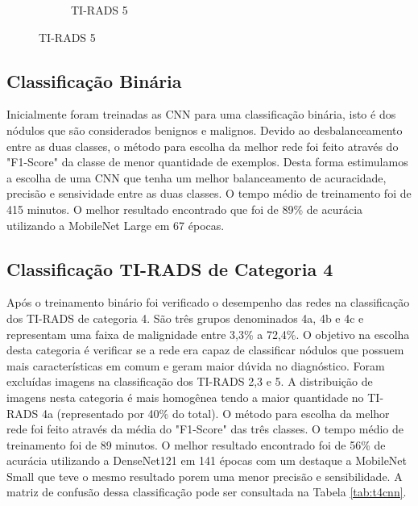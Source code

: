 \documentclass[12pt]{article}
\begin{document}
\begin{figure}[h]
\begin{subfigure}[t]{.3\textwidth}
  \caption{TI-RADS 5}
  \label{fig:t5s}
\end{subfigure}
\label{fig:tsquare}
\end{figure}

\subsection{Classificação Binária}

Inicialmente foram treinadas as CNN para uma classificação binária, isto é dos nódulos que são considerados benignos e malignos. Devido ao desbalanceamento entre as duas classes, o método para escolha da melhor rede foi feito através do "F1-Score" da classe de menor quantidade de exemplos. Desta forma estimulamos a escolha de uma CNN que tenha um melhor balanceamento de acuracidade, precisão e sensividade entre as duas classes. O tempo médio de treinamento foi de 415 minutos. O melhor resultado encontrado que foi de 89\% de acurácia utilizando a MobileNet Large em 67 épocas.

\subsection{Classificação TI-RADS de Categoria 4}
Após o treinamento binário foi verificado o desempenho das redes na classificação dos TI-RADS de categoria 4. São três grupos denominados 4a, 4b e 4c e representam uma faixa de malignidade entre 3,3\% a 72,4\%. O objetivo na escolha desta categoria é verificar se a rede era capaz de classificar nódulos que possuem mais características em comum e geram maior dúvida no diagnóstico. Foram excluídas imagens na classificação dos TI-RADS 2,3 e 5. A distribuição de imagens nesta categoria é mais homogênea tendo a maior quantidade no TI-RADS 4a (representado por 40\% do total). O método para escolha da melhor rede foi feito através da média do "F1-Score" das três classes. O tempo médio de treinamento foi de 89 minutos. O melhor resultado encontrado foi de 56\% de acurácia utilizando a DenseNet121 em 141 épocas com um destaque a MobileNet Small que teve o mesmo resultado porem uma menor precisão e sensibilidade. A matriz de confusão dessa classificação pode ser consultada na Tabela \ref{tab:t4cnn}.
\end{document}
